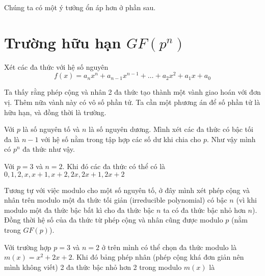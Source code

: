 Chúng ta có một ý tưởng ổn áp hơn ở phần sau.

\section{Trường hữu hạn $GF(p^n)$}

Xét các đa thức với hệ số nguyên
\[f(x) = a_n x^n + a_{n-1} x^{n-1} + \ldots + a_2 x^2 + a_1 x + a_0\]

Ta thấy rằng phép cộng và nhân 2 đa thức tạo thành một vành giao hoán với đơn vị.
Thêm nữa vành này có vô số phần tử. Ta cần một phương án để số phần tử là hữu hạn,
và đồng thời là trường.

Với $p$ là số nguyên tố và $n$ là số nguyên dương. Mình xét
các đa thức có bậc tối đa là $n-1$ với hệ số nằm trong tập hợp các số dư khi chia cho $p$.
Như vậy mình có $p^n$ đa thức như vậy.

\begin{example}
    Với $p=3$ và $n=2$. Khi đó các đa thức có thể có là
    $0, 1, 2, x, x+1, x+2, 2x, 2x+1, 2x+2$
\end{example}

Tương tự với việc modulo cho một số nguyên tố, ở đây mình 
xét phép cộng và nhân trên modulo một đa thức tối giản (irreducible 
polynomial) có bậc $n$ (vì khi modulo một đa thức bậc bất kì cho 
đa thức bậc $n$ ta có đa thức bậc nhỏ hơn $n$). Đồng thời hệ số của
đa thức từ phép cộng và nhân cũng được modulo $p$ (nằm trong $GF(p)$).

Với trường hợp $p=3$ và $n=2$ ở trên mình có thể chọn đa thức modulo 
là $m(x) = x^2 + 2x + 2$. Khi đó bảng phép nhân (phép cộng 
khá đơn giản nên mình không viết) 2 đa thức bậc 
nhỏ hơn 2 trong modulo $m(x)$ là

